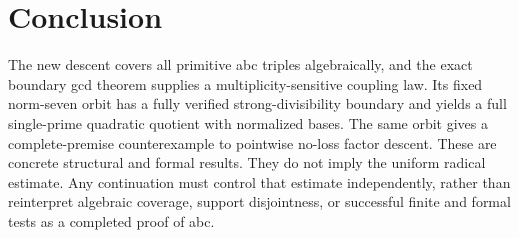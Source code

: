 \section{Conclusion}
The new descent covers all primitive abc triples algebraically, and the exact boundary gcd theorem supplies a multiplicity-sensitive coupling law. Its fixed norm-seven orbit has a fully verified strong-divisibility boundary and yields a full single-prime quadratic quotient with normalized bases. The same orbit gives a complete-premise counterexample to pointwise no-loss factor descent. These are concrete structural and formal results. They do not imply the uniform radical estimate. Any continuation must control that estimate independently, rather than reinterpret algebraic coverage, support disjointness, or successful finite and formal tests as a completed proof of abc.



\endgroup
